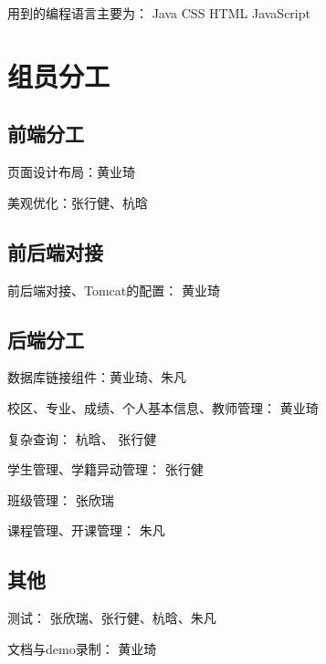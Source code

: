 \documentclass[../report.tex]{subfiles}
\begin{document}
用到的编程语言主要为： Java CSS HTML JavaScript

\section{组员分工}

\subsection{前端分工}

页面设计布局：黄业琦

美观优化：张行健、杭晗

\subsection{前后端对接}

前后端对接、Tomcat的配置： 黄业琦

\subsection{后端分工}

数据库链接组件：黄业琦、朱凡

校区、专业、成绩、个人基本信息、教师管理： 黄业琦

复杂查询： 杭晗、 张行健

学生管理、学籍异动管理： 张行健

班级管理： 张欣瑞

课程管理、开课管理： 朱凡

\subsection {其他}

测试： 张欣瑞、张行健、杭晗、朱凡

文档与demo录制： 黄业琦
\end{document}
